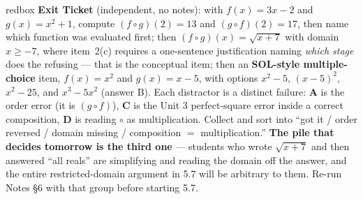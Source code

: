 \documentclass[10pt]{article}
\begin{document}
\begin{skillbox}{redbox}
\textbf{Exit Ticket} (independent, no notes): with $f(x)=3x-2$ and $g(x)=x^{2}+1$, compute
$(f\circ g)(2)=13$ and $(g\circ f)(2)=17$, then name which function was evaluated first; then
$(f\circ g)(x)=\sqrt{x+7}$ with domain $x\ge-7$, where item~2(c) requires a one-sentence
justification naming \emph{which stage} does the refusing --- that is the conceptual item; then an
\textbf{SOL-style multiple-choice} item, $f(x)=x^{2}$ and $g(x)=x-5$, with options $x^{2}-5$,
$(x-5)^{2}$, $x^{2}-25$, and $x^{3}-5x^{2}$ (answer B). Each distractor is a distinct failure:
\textbf{A} is the order error (it is $(g\circ f)$), \textbf{C} is the Unit 3 perfect-square error
inside a correct composition, \textbf{D} is reading $\circ$ as multiplication. Collect and sort into
``got it / order reversed / domain missing / composition $=$ multiplication.'' \textbf{The pile that
decides tomorrow is the third one} --- students who wrote $\sqrt{x+7}$ and then answered ``all
reals'' are simplifying and reading the domain off the answer, and the entire restricted-domain
argument in 5.7 will be arbitrary to them. Re-run Notes \S6 with that group before starting 5.7.
\end{skillbox}
\end{document}
